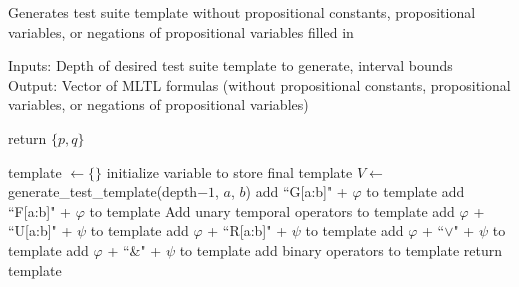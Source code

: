 \documentclass[runningheads]{llncs}
\renewcommand{\phi}{\varphi}
\begin{document}
\begin{algorithm}[H]
    \caption{Generates test suite template without propositional constants, propositional variables, or negations of propositional variables filled in}
    Inputs: Depth of desired test suite template to generate, interval bounds\\
    Output: Vector of MLTL formulas (without propositional constants, propositional variables, or negations of propositional variables)
    \begin{algorithmic}
            \State return $\{p, q\}$
        \EndIf
        
        \State template $\leftarrow \{\}$
        \Comment initialize variable to store final template
        \State $V \leftarrow$ generate\_test\_template(depth$- 1$, $a$, $b$)
        \For{(string $\phi \in V$)}
            \State add ``G[a:b]" + $\phi$ to template
            \State add ``F[a:b]" + $\phi$ to template
            \Comment Add unary temporal operators to template
                \State add $\phi$ + ``U[a:b]" + $\psi$ to template
                \State add  $\phi$ + ``R[a:b]" + $\psi$ to template
                \State add $\phi$ + ``$\lor$" + $\psi$ to template
                \State add $\phi$ + ``\&" + $\psi$ to template
                \Comment add binary operators to template
            \EndFor
        \EndFor
        \State return template
    \EndProcedure
    \end{algorithmic}
    
\end{algorithm}
\end{document}
